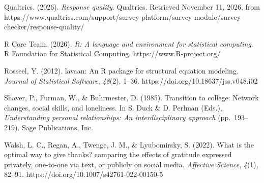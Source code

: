 \documentclass[
  letterpaper,
  DIV=11,
  numbers=noendperiod]{scrartcl}
\begin{document}
Qualtrics. (2026). \emph{Response quality}. Qualtrics. Retrieved
November 11, 2026, from
https://www.qualtrics.com/support/survey-platform/survey-module/survey-checker/response-quality/

R Core Team. (2026). \emph{R: A language and environment for statistical
computing}. R Foundation for Statistical Computing.
https://www.R-project.org/

Rosseel, Y. (2012). lavaan: An R package for structural equation
modeling. \emph{Journal of Statistical Software}, \emph{48}(2), 1--36.
https://doi.org/10.18637/jss.v048.i02

Shaver, P., Furman, W., \& Buhrmester, D. (1985). Transition to college:
Network changes, social skills, and loneliness. In S. Duck \& D. Perlman
(Eds.), \emph{Understanding personal relationships: An interdisciplinary
approach} (pp.~193--219). Sage Publications, Inc.

Walsh, L. C., Regan, A., Twenge, J. M., \& Lyubomirsky, S. (2022). What
is the optimal way to give thanks? comparing the effects of gratitude
expressed privately, one-to-one via text, or publicly on social media.
\emph{Affective Science}, \emph{4}(1), 82--91.
https://doi.org/10.1007/s42761-022-00150-5
\end{document}
